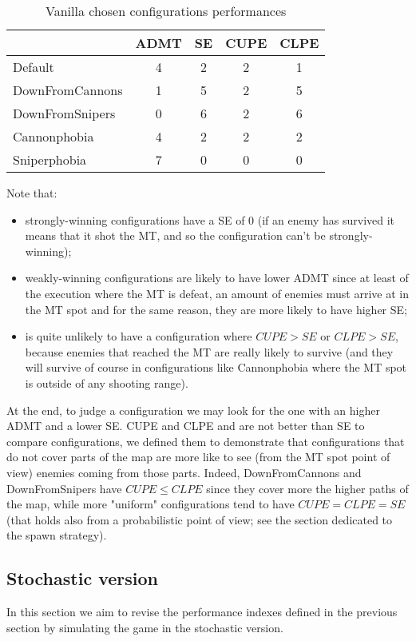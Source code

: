 \documentclass[
10pt, %
a4paper, %
oneside, %
headinclude,footinclude, %
BCOR5mm, %
]{scrartcl}
\begin{document}
			\begin{table}[h!]
				\centering
				\begin{tabular}{||l|c|c|c|c||}
					\hline
					& ADMT & SE & CUPE & CLPE \\
					\hline
					Default 		& 4 & 2 & 2 & 1 \\ \hline
					DownFromCannons & 1 & 5 & 2 & 5 \\ \hline
					DownFromSnipers & 0 & 6 & 2 & 6 \\ \hline
					Cannonphobia 	& 4 & 2 & 2 & 2 \\ \hline
					Sniperphobia 	& 7 & 0 & 0 & 0 \\ \hline
				\end{tabular}
				\caption{Vanilla chosen configurations performances}
			\end{table}
			Note that:
			\begin{itemize}
				\item strongly-winning configurations have a SE of 0 (if an enemy has survived it means that it shot the MT, and so the configuration can't be strongly-winning);
				\item weakly-winning configurations are likely to have lower ADMT since at least of the execution where the MT is defeat, an amount of enemies must arrive at in the MT spot and for the same reason, they are more likely to have higher SE;
				\item is quite unlikely to have a configuration where $CUPE>SE$ or $CLPE>SE$, because enemies that reached the MT are really likely to survive (and they will survive of course in configurations like Cannonphobia where the MT spot is outside of any shooting range).
			\end{itemize}
			At the end, to judge a configuration we may look for the one with an higher ADMT and a lower SE. CUPE and CLPE and are not better than SE to compare configurations, we defined them to demonstrate that configurations that do not cover parts of the map are more like to see (from the MT spot point of view) enemies coming from those parts. Indeed, DownFromCannons and DownFromSnipers have $CUPE\leq CLPE$ since they cover more the higher paths of the map, while more "uniform" configurations tend to have $CUPE=CLPE=SE$ (that holds also from a probabilistic point of view; see the section dedicated to the spawn strategy).
		\subsection{Stochastic version}
			In this section we aim to revise the performance indexes defined in the previous section by simulating the game in the stochastic version.
			
\end{document}
